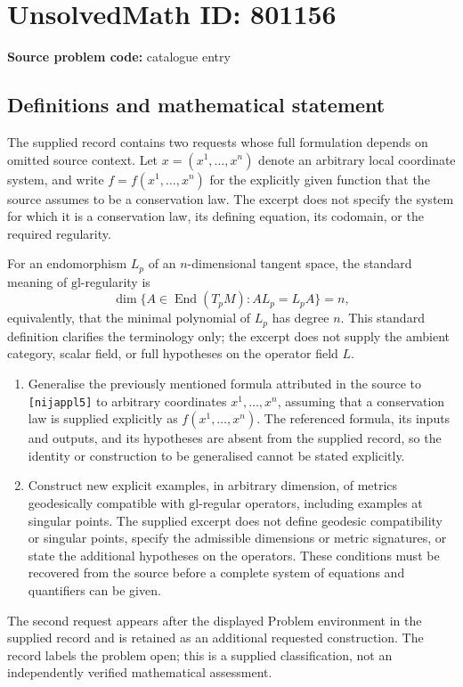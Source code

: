 \documentclass[11pt]{article}
\begin{document}
\section*{UnsolvedMath ID: 801156}
\textbf{Source problem code:} catalogue entry
\subsection{Definitions and mathematical statement}
The supplied record contains two requests whose full formulation depends on omitted source context. Let \(x=(x^1,\ldots,x^n)\) denote an arbitrary local coordinate system, and write \(f=f(x^1,\ldots,x^n)\) for the explicitly given function that the source assumes to be a conservation law. The excerpt does not specify the system for which it is a conservation law, its defining equation, its codomain, or the required regularity.

For an endomorphism \(L_p\) of an \(n\)-dimensional tangent space, the standard meaning of \(\mathrm{gl}\)-regularity is
\[
\dim\{A\in\operatorname{End}(T_pM):AL_p=L_pA\}=n,
\]
equivalently, that the minimal polynomial of \(L_p\) has degree \(n\). This standard definition clarifies the terminology only; the excerpt does not supply the ambient category, scalar field, or full hypotheses on the operator field \(L\).

\begin{enumerate}
\item Generalise the previously mentioned formula attributed in the source to \texttt{[nijappl5]} to arbitrary coordinates \(x^1,\ldots,x^n\), assuming that a conservation law is supplied explicitly as \(f(x^1,\ldots,x^n)\). The referenced formula, its inputs and outputs, and its hypotheses are absent from the supplied record, so the identity or construction to be generalised cannot be stated explicitly.
\item Construct new explicit examples, in arbitrary dimension, of metrics geodesically compatible with \(\mathrm{gl}\)-regular operators, including examples at singular points. The supplied excerpt does not define geodesic compatibility or singular points, specify the admissible dimensions or metric signatures, or state the additional hypotheses on the operators. These conditions must be recovered from the source before a complete system of equations and quantifiers can be given.
\end{enumerate}
The second request appears after the displayed Problem environment in the supplied record and is retained as an additional requested construction. The record labels the problem open; this is a supplied classification, not an independently verified mathematical assessment.
\end{document}
